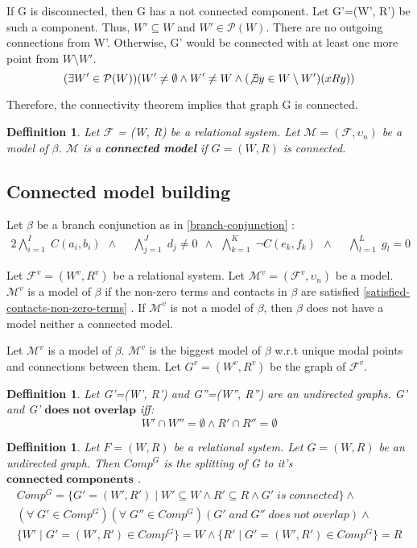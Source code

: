 \documentclass{article}
\newcommand\M{\mathcal{M}}
\newcommand\F{\mathcal{F}}
\newcommand\p{\mathcal{P}}
\newtheorem{defn}[theorem]{Deffinition}
\newcommand{\BranchConjunction}{%
\begin{alignat}{2}
			\bigwedge_{i=1}^{I} \; C(a_i, b_i) \:\: \wedge \:\: &
			\bigwedge_{j=1}^{J} \; d_j \neq 0 \:\: \wedge \:\:
			\bigwedge_{k=1}^{K} \; \neg C(e_k, f_k) \:\: \wedge \:\: &
			\bigwedge_{l=1}^{L} \; g_l = 0 \:\:
\end{alignat}%
}
\begin{document}
	If G is disconnected, then G has a not connected component. Let G'=(W', R') be such a component. Thus, $W' \subseteq W$ and $W' \in \p(W)$. There are no outgoing connections from W'. Otherwise, G' would be connected with at least one more point from $W \setminus W'$.
		\begin{equation}
			(\exists W' \in \p(W))(W' \neq \emptyset \land W' \neq W \land (\not\exists y \in W \setminus W')(xRy))
		\end{equation}

	Therefore, the connectivity theorem implies that graph G is connected.

	\begin{defn}
		Let $\F$ = (W, R) be a relational system. Let $\M = (\F, \upsilon_n)$ be a model of $\beta$. $\M$ is a \textbf{connected model} if $G = (W, R)$ is connected.
	\end{defn}

	\subsection{Connected model building}
	\label{connected-model-building}

		Let $\beta$ be a branch conjunction as in \ref{branch-conjunction} :
		\nonumber\BranchConjunction

		Let $\F^v = (W^v, R^v)$ be a relational system. Let $\M^v = (\F^v, \upsilon_n)$ be a model. $\M^v$ is a model of $\beta$ if the non-zero terms and contacts in $\beta$ are satisfied \ref{satisfied-contacts-non-zero-terms} .	If $\M^v$ is not a model of $\beta$, then $\beta$ does not have a model neither a connected model.

		Let $\M^v$ is a model of $\beta$. $\M^v$ is the biggest model of $\beta$ w.r.t unique modal points and connections between them. Let $G^v=(W^v, R^v)$ be the graph of $\F^v$.

		\begin{defn}
			Let G'=(W', R') and G''=(W'', R'') are an undirected graphs. G' and G' $\mathbf{does \; not \; overlap}$ iff:
			\begin{equation}
				W' \cap W'' = \emptyset \land R' \cap R'' = \emptyset
			\end{equation}
		\end{defn}

		\begin{defn}
			Let $F = (W, R)$ be a relational system. Let $G = (W, R)$ be an undirected graph. Then $Comp^G$ is the splitting of G to it's $\mathbf{connected \; components}$ .
			\begin{align*}
				Comp^G = \{G'=(W', R') \mid W' \subseteq W \land R' \subseteq R \land G'\;is\;connected \} \land \\
				(\forall \; G' \in Comp^G)(\forall \; G'' \in Comp^G)(G' \; and \; G'' \; does \; not \; overlap) \land \\
				\{ W' \mid G'=(W', R') \in Comp^G \} = W \land \{ R' \mid G'=(W', R') \in Comp^G \} = R
			\end{align*}
		\end{defn}
\end{document}
